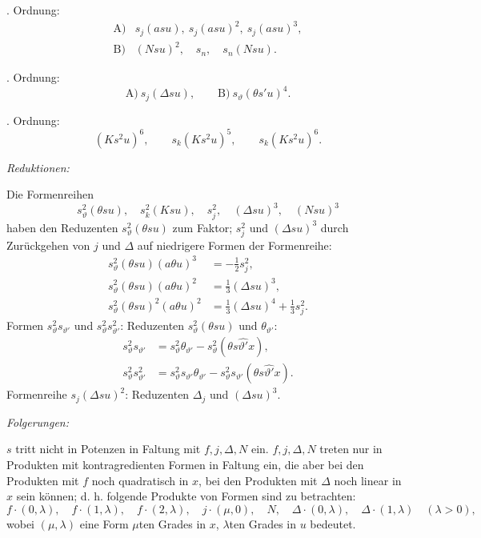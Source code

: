 \documentclass[11pt]{article}
\newcommand{\A}{\Delta}
\begin{document}
. Ordnung:
\[
\begin{array}{ll}
\text{A)}&s_j(asu),\ s_j(asu)^2,\ s_j(asu)^3,\\[0.4em]
\text{B)}&(Nsu)^2,\quad s_n,\quad s_n(Nsu).
\end{array}
\]

. Ordnung:
\[
\text{A)}\ s_j(\A su),\qquad \text{B)}\ s_\vartheta(\theta s'u)^4.
\]

. Ordnung:
\[
(Ks^2u)^6,\qquad s_k(Ks^2u)^5,
\qquad s_k(Ks^2u)^6.
\]

\noindent\emph{Reduktionen:}

Die Formenreihen
\[
 s_\vartheta^2(\theta su),\quad s_k^2(Ksu),\quad s_j^2,\quad (\A su)^3,
 \quad (Nsu)^3
\]
haben den Reduzenten $s_\vartheta^2(\theta su)$ zum Faktor; $s_j^2$ und $(\A su)^3$ durch Zurückgehen von $j$ und $\A$ auf niedrigere Formen der Formenreihe:
\[
\begin{aligned}
s_\vartheta^2(\theta su)(a\theta u)^3&=-\frac12s_j^2,\\
s_\vartheta^2(\theta su)(a\theta u)^2&=\frac13(\A su)^3,\\
s_\vartheta^2(\theta su)^2(a\theta u)^2&=\frac13(\A su)^4+\frac13s_j^2.
\end{aligned}
\]
Formen $s_\vartheta^2s_{\vartheta'}$ und $s_\vartheta^2s_{\vartheta'}^2$: Reduzenten $s_\vartheta^2(\theta su)$ und $\theta_{\vartheta'}$:
\[
\begin{aligned}
s_\vartheta^2s_{\vartheta'}&=s_\vartheta^2\theta_{\vartheta'}-s_\vartheta^2(\theta s\widehat{\vartheta'}x),\\
s_\vartheta^2s_{\vartheta'}^2&=s_\vartheta^2s_{\vartheta'}\theta_{\vartheta'}-s_\vartheta^2s_{\vartheta'}(\theta s\widehat{\vartheta'}x).
\end{aligned}
\]
Formenreihe $s_j(\A su)^2$: Reduzenten $\A_j$ und $(\A su)^3$.

\noindent\emph{Folgerungen:}

$s$ tritt nicht in Potenzen in Faltung mit $f,j,\A,N$ ein. $f,j,\A,N$ treten nur in Produkten mit kontragredienten Formen in Faltung ein, die aber bei den Produkten mit $f$ noch quadratisch in $x$, bei den Produkten mit $\A$ noch linear in $x$ sein können; d. h. folgende Produkte von Formen sind zu betrachten:
\[
 f\cdot(0,\lambda),\quad f\cdot(1,\lambda),\quad f\cdot(2,\lambda),\quad
 j\cdot(\mu,0),\quad N,\quad
 \A\cdot(0,\lambda),\quad \A\cdot(1,\lambda)\quad(\lambda>0),
\]
wobei $(\mu,\lambda)$ eine Form $\mu$ten Grades in $x$, $\lambda$ten Grades in $u$ bedeutet.
\end{document}
